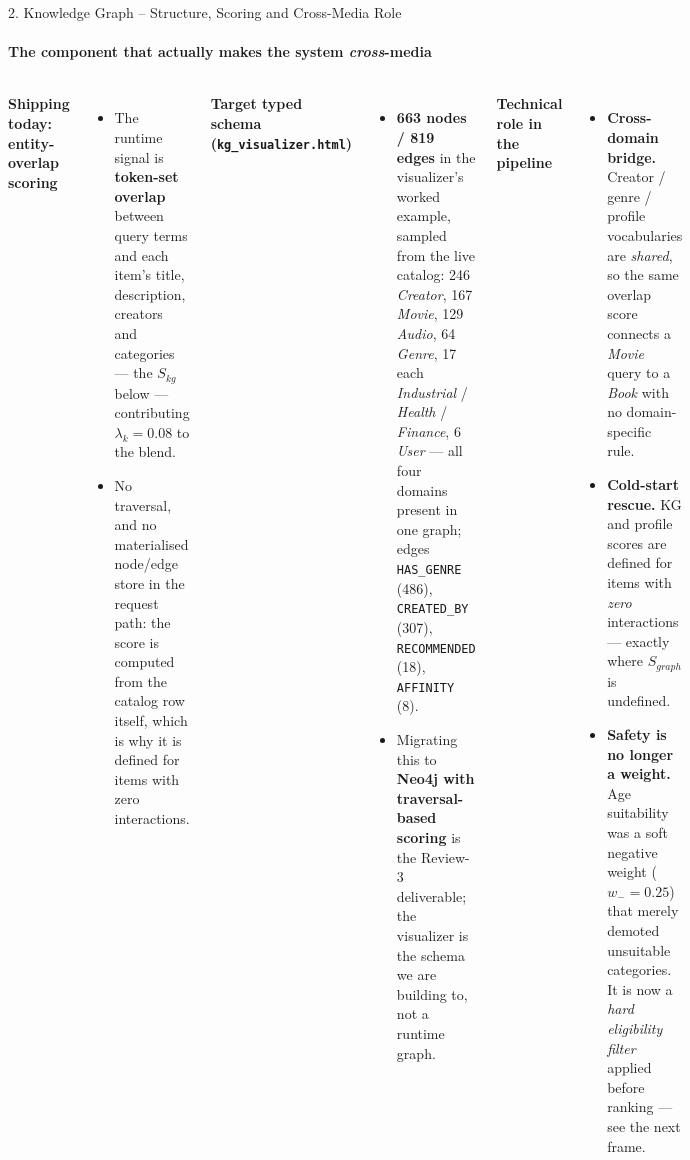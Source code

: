 \documentclass[aspectratio=169, 11pt]{beamer}
\begin{document}
\begin{frame}{2. Knowledge Graph -- Structure, Scoring and Cross-Media Role}
\framesubtitle{The component that actually makes the system \emph{cross}-media}
\vspace{-1mm}
\begin{columns}[T]
{\scriptsize \textbf{Shipping today: entity-overlap scoring}}
\begin{itemize}\tiny
  \item The runtime signal is \textbf{token-set overlap} between query terms and each item's title, description, creators and categories --- the $S_{\mathit{kg}}$ below --- contributing $\lambda_k{=}0.08$ to the blend.
  \item No traversal, and no materialised node/edge store in the request path: the score is computed from the catalog row itself, which is why it is defined for items with zero interactions.
\end{itemize}
\vspace{0.5mm}
{\scriptsize \textbf{Target typed schema (\texttt{kg\_visualizer.html})}}
\begin{itemize}\tiny
  \item \textbf{663 nodes / 819 edges} in the visualizer's worked example, sampled from the live catalog: 246 \emph{Creator}, 167 \emph{Movie}, 129 \emph{Audio}, 64 \emph{Genre}, 17 each \emph{Industrial} / \emph{Health} / \emph{Finance}, 6 \emph{User} --- all four domains present in one graph; edges \texttt{HAS\_GENRE} (486), \texttt{CREATED\_BY} (307), \texttt{RECOMMENDED} (18), \texttt{AFFINITY} (8).
  \item Migrating this to \textbf{Neo4j with traversal-based scoring} is the Review-3 deliverable; the visualizer is the schema we are building to, not a runtime graph.
\end{itemize}
\vspace{0.5mm}
{\scriptsize \textbf{Technical role in the pipeline}}
\begin{itemize}\tiny
  \item \textbf{Cross-domain bridge.} Creator / genre / profile vocabularies are \emph{shared}, so the same overlap score connects a \emph{Movie} query to a \emph{Book} with no domain-specific rule.
  \item \textbf{Cold-start rescue.} KG and profile scores are defined for items with \emph{zero} interactions --- exactly where $S_{\mathit{graph}}$ is undefined.
  \item \textbf{Safety is no longer a weight.} Age suitability was a soft negative weight ($w_-\!=\!0.25$) that merely demoted unsuitable categories. It is now a \emph{hard eligibility filter} applied before ranking --- see the next frame.

\end{itemize}
\end{columns}
\end{frame}
\end{document}
